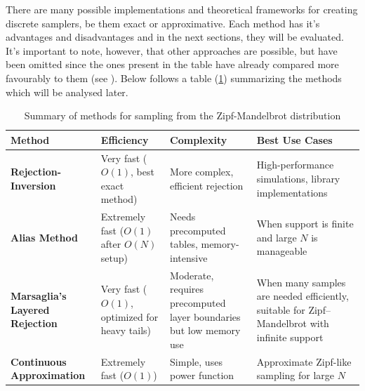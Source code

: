 There are many possible implementations and theoretical frameworks for creating discrete samplers, be them exact or approximative. Each method has it's
advantages and disadvantages and in the next sections, they will be evaluated. It's important to note, however, that other approaches are possible, but have been omitted since
the ones present in the table have already compared more favourably to them (see \cite{devroyeDiscreteUnivariateDistributions1986,kronmalAliasMethodGenerating1979,kuhlHistoryRandomVariate2017}). Below follows a table (\ref{tab:zipf_sampling}) summarizing the methods which will be analysed later. 
\begin{table}[ht]
    \centering
    \renewcommand{\arraystretch}{1.3}
    \setlength{\tabcolsep}{3pt} %

    \begin{tabular}{p{3cm} p{3cm} p{4cm} p{5cm}}
        \toprule
        \textbf{Method} & \textbf{Efficiency} & \textbf{Complexity} & \textbf{Best Use Cases} \\
        \midrule
        \textbf{Rejection-Inversion \cite{hormannRejectioninversionGenerateVariates1996}} & Very fast ($O(1)$, best exact method) & More complex, efficient rejection & High-performance simulations, library implementations \\ \hline
        \textbf{Alias Method \cite{kronmalAliasMethodGenerating1979}} & Extremely fast ($O(1)$ after $O(N)$ setup) & Needs precomputed tables, memory-intensive & When support is finite and large $N$ is manageable \\ \hline
        \textbf{Marsaglia’s Layered Rejection \cite{marsagliaFastGenerationDiscrete2004}} & Very fast ($O(1)$, optimized for heavy tails) & Moderate, requires precomputed layer boundaries but low memory use & When many samples are needed efficiently, suitable for Zipf–Mandelbrot with infinite support \\ \hline
        \textbf{Continuous Approximation} & Extremely fast ($O(1)$) & Simple, uses power function & Approximate Zipf-like sampling for large $N$ \\
        \bottomrule
    \end{tabular}
    \caption{Summary of methods for sampling from the Zipf-Mandelbrot distribution}
    \label{tab:zipf_sampling}
\end{table}


